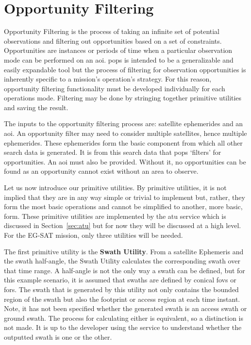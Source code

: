 \section{Opportunity Filtering} \label{sec:opp-filtering}

Opportunity Filtering is the process of taking an infinite set of potential
observations and filtering out opportunities based on a set of constraints.
Opportunities are instances or periods of time when a particular observation
mode can be performed on an \gls{aoi}. \gls{pops} is intended to be a
generalizable and easily expandable tool but the process of filtering for
observation opportunities is inherently specific to a mission’s operation’s
strategy.  For this reason, opportunity filtering functionality must be
developed individually for each operations mode.  Filtering may be done by
stringing together primitive utilities and saving the result. 

The inputs to the opportunity filtering process are: satellite ephemerides and
an \gls{aoi}. An opportunity filter may need to consider multiple satellites,
hence multiple ephemerides. These ephemerides form the basic component from
which all other search data is generated. It is from this search data that
\gls{pops} `filters' for opportunities. An \gls{aoi} must also be provided.
Without it, no opportunities can be found as an opportunity cannot exist
without an area to observe.

Let us now introduce our primitive utilities. By primitive utilities, it is not
implied that they are in any way simple or trivial to implement but, rather,
they form the most basic operations and cannot be simplified to another, more
basic, form.  These primitive utilities are implemented by the \gls{atu}
service which is discussed in Section~\ref{sec:atu} but for now they will be
discussed at a high level. For the EG-SAT mission, only three utilities will be
needed.

The first primitive utility is the \textbf{Swath Utility}. From a satellite
Ephemeris and the swath half-angle, the Swath Utility calculates the
corresponding swath over that time range. A half-angle is not the only way a
swath can be defined, but for this example scenario, it is assumed that swaths
are defined by conical \glspl{fov} or \glspl{for}. The swath that is generated
by this utility not only contains the bounded region of the swath but also the
footprint or access region at each time instant. Note, it has not been
specified whether the generated swath is an access swath or ground swath.  The
process for calculating either is equivalent, so a distinction is not made.  It
is up to the developer using the service to understand whether the outputted
swath is one or the other.

